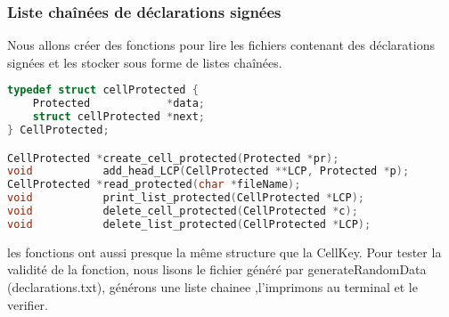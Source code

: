 \documentclass{article}
\begin{document}
\subsubsection{Liste chaînées de déclarations signées}
Nous allons créer des fonctions pour lire les fichiers contenant des déclarations signées et les stocker sous forme de listes chaînées.\newline
\begin{lstlisting}[language={C}]
typedef struct cellProtected {
    Protected            *data;
    struct cellProtected *next;
} CellProtected;

CellProtected *create_cell_protected(Protected *pr);
void           add_head_LCP(CellProtected **LCP, Protected *p);
CellProtected *read_protected(char *fileName);
void           print_list_protected(CellProtected *LCP);
void           delete_cell_protected(CellProtected *c);
void           delete_list_protected(CellProtected *LCP);
\end{lstlisting}
les fonctions ont aussi presque la même structure que la CellKey.\newline\newline
Pour tester la validité de la fonction, nous lisons le fichier généré par generateRandomData (declarations.txt), générons une liste chainee ,l'imprimons au terminal et le verifier.\newline
\end{document}
